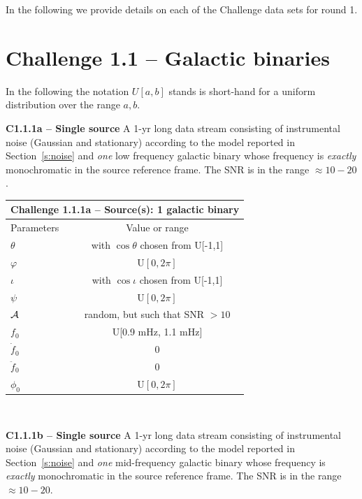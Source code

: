 \documentclass[11pt]{report}
\begin{document}
In the following we provide details on each of the Challenge data sets for round 1.


\section{Challenge 1.1 -- Galactic binaries}

In the following the notation $U[a,b]$ stands is short-hand for a uniform distribution over the range $a,b$.


\begin{description}

\item {\bf C1.1.1a -- Single source} A 1-yr long data stream consisting of instrumental noise (Gaussian and stationary) according to the model reported in Section~\ref{s:noise} and {\em one} low frequency galactic binary whose frequency is {\em exactly} monochromatic in the source reference frame. The SNR is in the range $\approx 10-20$. 

\begin{center}
\begin{tabular}{l|c}
\hline \hline
\multicolumn{2}{c}{{\bf Challenge 1.1.1a -- Source(s): 1 galactic binary}} \\
\hline
Parameters & Value or range \\
\hline
$\theta$          & with $\cos\theta$ chosen from U[-1,1]\\
$\varphi$         & U$[0,2\pi]$ \\ 
$\iota$           & with $\cos\iota$ chosen from U[-1,1]\\ 
$\psi$            & U$[0,2\pi]$ \\
${\cal A}$        & random, but such that SNR $> 10$ \\
$f_0$             & U[0.9 mHz, 1.1 mHz] \\ 
$\dot{f}_0$       & 0 \\ 
$\ddot{f}_0$      & 0\\ 
$\phi_0$          & U$[0,2\pi]$ \\
\hline \hline
\end{tabular} \\
\end{center}


\item {\bf C1.1.1b -- Single source} A 1-yr long data stream consisting of instrumental noise (Gaussian and stationary) according to the model reported in Section~\ref{s:noise} and {\em one} mid-frequency galactic binary whose frequency is {\em exactly} monochromatic in the source reference frame. The SNR is in the range $\approx 10-20$. 


\end{description}
\end{document}
